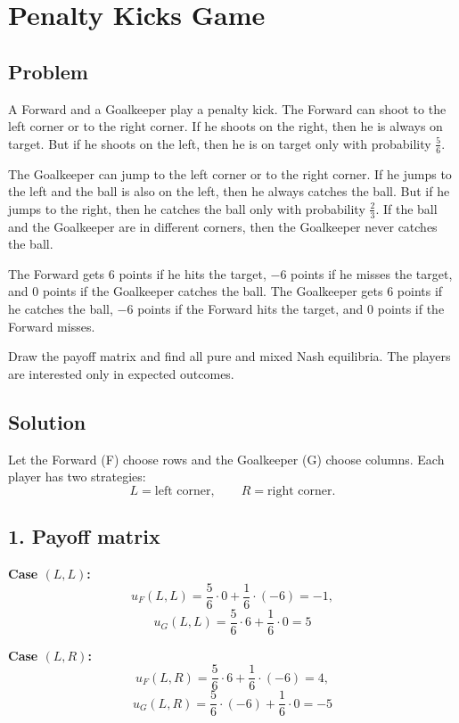 \section*{Penalty Kicks Game}

\subsection*{Problem}

A Forward and a Goalkeeper play a penalty kick. The Forward can shoot to the left corner or to the right corner. If he shoots on the right, then he is always on target. But if he shoots on the left, then he is on target only with probability $\frac{5}{6}$.

The Goalkeeper can jump to the left corner or to the right corner. If he jumps to the left and the ball is also on the left, then he always catches the ball. But if he jumps to the right, then he catches the ball only with probability $\frac{2}{3}$. If the ball and the Goalkeeper are in different corners, then the Goalkeeper never catches the ball.

The Forward gets $6$ points if he hits the target, $-6$ points if he misses the target, and $0$ points if the Goalkeeper catches the ball. The Goalkeeper gets $6$ points if he catches the ball, $-6$ points if the Forward hits the target, and $0$ points if the Forward misses.

Draw the payoff matrix and find all pure and mixed Nash equilibria. The players are interested only in expected outcomes.

\subsection*{Solution}

Let the Forward (F) choose rows and the Goalkeeper (G) choose columns. Each player has two strategies:
\[
L=\text{left corner}, \qquad R=\text{right corner}.
\]

\subsection*{1. Payoff matrix}

\textbf{Case $(L,L)$:}
\[
u_F(L,L)=\frac{5}{6}\cdot 0 + \frac{1}{6}\cdot(-6)=-1,
\]
\[
u_G(L,L)=\frac{5}{6}\cdot 6 + \frac{1}{6}\cdot 0=5
\]

\textbf{Case $(L,R)$:}
\[
u_F(L,R)=\frac{5}{6}\cdot 6 + \frac{1}{6}\cdot(-6)=4,
\]
\[
u_G(L,R)=\frac{5}{6}\cdot(-6) + \frac{1}{6}\cdot 0=-5
\]

